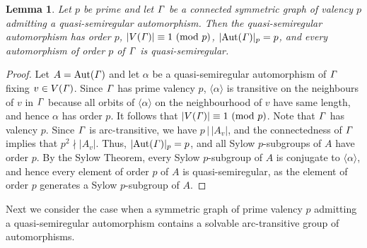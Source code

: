 \documentclass[12pt,reqno]{amsart}
\renewcommand\div{\,\big|\,} \newcommand\ddiv{\,\big\Vert\,}\newcommand\notdiv{{\,\not\big|\,}}
\renewcommand\a{\alpha}  \renewcommand\b{\beta}
\numberwithin {equation} {section}
\newtheorem{lemma}[theorem]{Lemma}
\begin{document}
\begin{lemma}\label{lm:5qs}
Let $p$ be prime and let ${\it \Gamma}$ be a connected symmetric graph of valency $p$ admitting a quasi-semiregular automorphism. Then the quasi-semiregular automorphism has order $p$, $|V({\it \Gamma})|\equiv 1 \ ({\rm mod~} p)$,  $|\mathrm{Aut}({\it \Gamma})|_p=p$, and every automorphism of order $p$ of ${\it \Gamma}$ is quasi-semiregular.
\end{lemma}
\begin{proof} Let $A=\mathrm{Aut}({\it \Gamma})$ and let $\a$ be a quasi-semiregular automorphism of ${\it \Gamma}$ fixing $v\in V({\it \Gamma})$. Since ${\it \Gamma}$ has prime valency $p$, $\langle\a\rangle$ is transitive on the neighbours of $v$ in ${\it \Gamma}$ because all orbits of $\langle\a\rangle$ on the neighbourhood of $v$ have same length, and hence $\a$ has order $p$. It follows that $|V({\it \Gamma})|\equiv 1 \ ({\rm mod~} p)$. Note that ${\it \Gamma}$ has valency $p$. Since ${\it \Gamma}$ is arc-transitive, we have $p\div |A_v|$, and the connectedness of ${\it \Gamma}$ implies that $p^2\nmid |A_v|$. Thus, $|\mathrm{Aut}({\it \Gamma})|_p=p$, and all Sylow $p$-subgroups of $A$ have order $p$. By the Sylow Theorem, every Sylow $p$-subgroup of $A$ is conjugate to $\langle \a\rangle$, and hence every element of order $p$ of $A$ is quasi-semiregular, as the element of order $p$ generates a Sylow $p$-subgroup of $A$.
\end{proof}

Next we consider the case when a symmetric graph of prime valency $p$ admitting a quasi-semiregular automorphism contains a solvable arc-transitive group of automorphisms.
\end{document}
